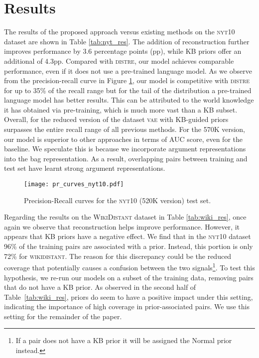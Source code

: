\documentclass[11pt]{article}
\begin{document}
\section{Results}

The results of the proposed approach versus existing methods on the \textsc{nyt10} dataset are shown in Table \ref{tab:nyt_res}.
The addition of reconstruction further improves performance by 3.6 percentage points (pp), while KB priors offer an additional of 4.3pp.
Compared with \textsc{distre}, our model achieves comparable performance, even if it does not use a pre-trained language model. As we observe from the precision-recall curve in Figure \ref{fig:pr_nyt_520}, our model is competitive with \textsc{distre} for up to 35\% of the recall range but for the tail of the distribution a pre-trained language model has better results. This can be attributed to the world knowledge it has obtained via pre-training, which is much more vast than a KB subset. 
Overall, for the reduced version of the dataset \textsc{vae} with KB-guided priors surpasses the entire recall range of all previous methods.
For the 570K version, our model is superior to other approaches in terms of AUC score, even for the baseline. We speculate this is because we incorporate argument representations into the bag representation. As a result, overlapping pairs between training and test set have learnt strong argument representations.

\begin{figure}[t!]
    \centering
    \texttt{[image: pr\_curves\_nyt10.pdf]}
    \caption{Precision-Recall curves for the \textsc{nyt10} (520K version) test set.}
    \label{fig:pr_nyt_520}
\end{figure}


Regarding the results on the \textsc{WikiDistant} dataset in Table \ref{tab:wiki_res}, once again we observe that reconstruction helps improve performance. However, it appears that KB priors have a negative effect. 
We find that in the \textsc{nyt10} dataset 96\% of the training pairs are associated with a prior. Instead, this portion is only 72\% for \textsc{wikidistant}. The reason for this discrepancy could be the reduced coverage that potentially causes a confusion between the two signals\footnote{If a pair does not have a KB prior it will be assigned the Normal prior instead.}.
To test this hypothesis, we re-run our models on a subset of the training data, removing pairs that do not have a KB prior. As observed in the second half of Table~\ref{tab:wiki_res}, priors do seem to have a positive impact under this setting, indicating the importance of high coverage in prior-associated pairs. We use this setting for the remainder of the paper.
\end{document}
